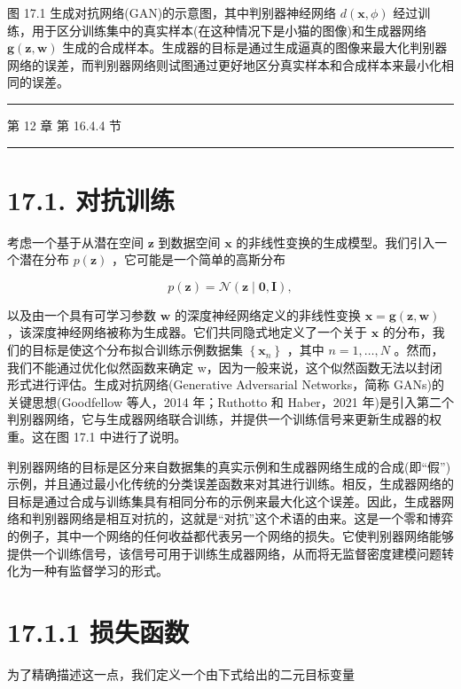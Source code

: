 \documentclass[10pt]{report}
\newcommand{\HRule}{\begin{center}\rule{0.9\linewidth}{0.2mm}\end{center}}
\begin{document}
图 17.1 生成对抗网络(GAN)的示意图，其中判别器神经网络 \(d\left( {\mathbf{x},\phi }\right)\) 经过训练，用于区分训练集中的真实样本(在这种情况下是小猫的图像)和生成器网络 \(\mathbf{g}\left( {\mathbf{z},\mathbf{w}}\right)\) 生成的合成样本。生成器的目标是通过生成逼真的图像来最大化判别器网络的误差，而判别器网络则试图通过更好地区分真实样本和合成样本来最小化相同的误差。

\HRule

第 12 章 第 16.4.4 节

\HRule

\section*{17.1. 对抗训练}

考虑一个基于从潜在空间 \(\mathbf{z}\) 到数据空间 \(\mathbf{x}\) 的非线性变换的生成模型。我们引入一个潜在分布 \(p\left( \mathbf{z}\right)\) ，它可能是一个简单的高斯分布

\[
p\left( \mathbf{z}\right)  = \mathcal{N}\left( {\mathbf{z} \mid  \mathbf{0},\mathbf{I}}\right) , \tag{17.1}
\]

以及由一个具有可学习参数 \(\mathbf{w}\) 的深度神经网络定义的非线性变换 \(\mathbf{x} = \mathbf{g}\left( {\mathbf{z},\mathbf{w}}\right)\) ，该深度神经网络被称为生成器。它们共同隐式地定义了一个关于 \(\mathbf{x}\) 的分布，我们的目标是使这个分布拟合训练示例数据集 \(\left\{  {\mathbf{x}}_{n}\right\}\) ，其中 \(n = 1,\ldots ,N\) 。然而，我们不能通过优化似然函数来确定 w，因为一般来说，这个似然函数无法以封闭形式进行评估。生成对抗网络(Generative Adversarial Networks，简称 GANs)的关键思想(Goodfellow 等人，2014 年；Ruthotto 和 Haber，2021 年)是引入第二个判别器网络，它与生成器网络联合训练，并提供一个训练信号来更新生成器的权重。这在图 17.1 中进行了说明。

判别器网络的目标是区分来自数据集的真实示例和生成器网络生成的合成(即“假”)示例，并且通过最小化传统的分类误差函数来对其进行训练。相反，生成器网络的目标是通过合成与训练集具有相同分布的示例来最大化这个误差。因此，生成器网络和判别器网络是相互对抗的，这就是“对抗”这个术语的由来。这是一个零和博弈的例子，其中一个网络的任何收益都代表另一个网络的损失。它使判别器网络能够提供一个训练信号，该信号可用于训练生成器网络，从而将无监督密度建模问题转化为一种有监督学习的形式。

\section*{17.1.1 损失函数}

为了精确描述这一点，我们定义一个由下式给出的二元目标变量
\end{document}
